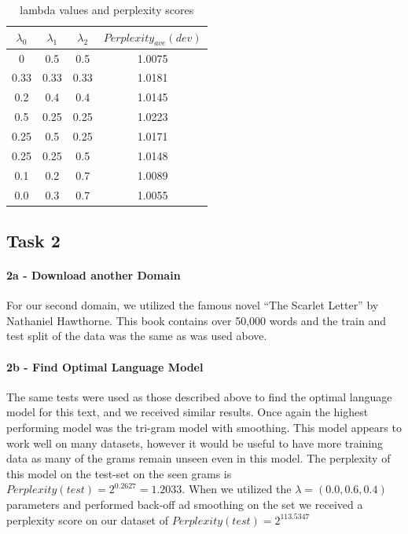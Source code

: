 \documentclass[paper=a4, fontsize=11pt]{scrartcl} %
\begin{document}
\begin{table}
\centering
\label{tab:table1}
\caption{lambda values and perplexity scores}
\begin{tabular}{|c|c|c|c|}
\hline
$\lambda_0$ & $\lambda_1$ & $\lambda_2$ & $Perplexity_{ave}(dev)$ \\ \hline \hline
0 & 0.5 & 0.5 & 1.0075  \\ \hline
0.33 & 0.33 & 0.33 & 1.0181 \\ \hline
0.2 & 0.4 & 0.4 & 1.0145 \\ \hline
0.5 & 0.25 & 0.25 & 1.0223 \\ \hline
0.25 & 0.5 & 0.25 & 1.0171 \\ \hline
0.25 & 0.25 & 0.5 & 1.0148 \\ \hline
0.1 & 0.2 & 0.7 & 1.0089 \\ \hline
0.0 & 0.3 & 0.7 & 1.0055 \\ \hline
\end{tabular}
\end{table}

\subsection{Task 2}
\paragraph{2a - Download another Domain}
For our second domain, we utilized the famous novel ``The Scarlet Letter'' by Nathaniel Hawthorne.  This book contains over 50,000 words and the train and test split of the data was the same as was used above.

\paragraph{2b - Find Optimal Language Model}
The same tests were used as those described above to find the optimal language model for this text, and we received similar results.  Once again the highest performing model was the tri-gram model with smoothing.  This model appears to work well on many datasets, however it would be useful to have more training data as many of the grams remain unseen even in this model.  The perplexity of this model on the test-set on the seen grams is $Perplexity(test)=2^{0.2627}=1.2033$.  When we utilized the $\lambda=(0.0,0.6,0.4)$ parameters and performed back-off ad smoothing on the set we received a perplexity score on our dataset of $Perplexity(test)=2^{113.5347}$
\end{document}
